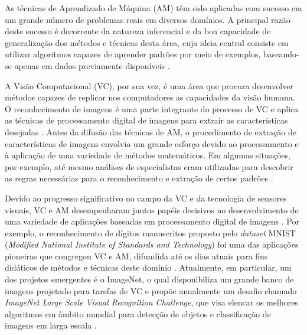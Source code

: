 
As técnicas de Aprendizado de Máquina (AM) têm sido aplicadas com sucesso em um grande número de problemas reais em diversos domínios. A principal razão deste sucesso é decorrente da natureza inferencial e da boa capacidade de generalização dos métodos e técnicas desta área, cuja ideia central consiste em utilizar algoritmos capazes de aprender padrões por meio de exemplos, baseando-se apenas em dados previamente disponíveis \cite{ref:faceli,ref:gulli}.

A Visão Computacional (VC), por sua vez, é uma área que procura desenvolver métodos capazes de replicar nos computadores as capacidades da visão humana. O reconhecimento de imagens é uma parte integrante do processo de VC e aplica as técnicas de processamento digital de imagens para extrair as características desejadas \cite{ref:khan}. Antes da difusão das técnicas de AM, o procedimento de extração de características de imagens envolvia um grande esforço devido ao processamento e à aplicação de uma variedade de métodos matemáticos. Em algumas situações, por exemplo, até mesmo análises de especialistas eram utilizadas para descobrir as regras necessárias para o reconhecimento e extração de certos padrões \cite{ref:faceli}. 

Devido ao progresso significativo no campo da VC e da tecnologia de sensores visuais, VC e  AM desempenharam juntos papéis decisivos no desenvolvimento de uma variedade de aplicações baseadas em processamento digital de imagens \cite{ref:khan}. Por exemplo, o reconhecimento de dígitos manuscritos proposto pelo \textit{dataset} MNIST (\emph{Modified National Institute of Standards and Technology}) foi uma das aplicações pioneiras que congregou VC e AM, difundida até os dias atuais para fins didáticos de métodos e técnicas deste domínio \cite{ref:MNIST}. Atualmente, em particular, um dos projetos emergentes é o ImageNet, o qual disponibiliza um grande banco de imagens projetado para tarefas de VC e propõe anualmente um desafio chamado \emph{ImageNet Large Scale Visual Recognition Challenge}, que visa elencar os melhores algoritmos em âmbito mundial para detecção de objetos e classificação de imagens em larga escala \cite{ref:image-net}.


